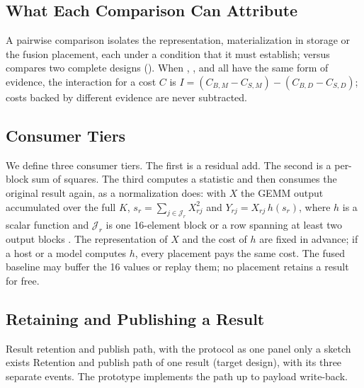 \subsection{What Each Comparison Can Attribute}\label{sec:attribution}

\begin{table}[t]
\centering{}%
\caption{Attribution matrix: what each pairwise comparison isolates, and the condition it must establish, not assume.}\label{tab:attribution}

\end{table}

%
A pairwise comparison isolates the representation, materialization in storage or the fusion placement, each under a condition that it must establish; \armBD versus \armSE compares two complete designs ().
When \armBD, \armSD, \armBM and \armSM all have the same form of evidence, the interaction for a cost $C$ is $I=(C_{B,M}-C_{S,M})-(C_{B,D}-C_{S,D})$; costs backed by different evidence are never subtracted.

\subsection{Consumer Tiers}\label{sec:tiers}

%
We define three consumer tiers.
The first is a residual add.
The second is a per-block sum of squares.
The third computes a statistic and then consumes the original result again, as a normalization does: with $X$ the GEMM output accumulated over the full $K$, $s_r=\sum_{j\in\mathcal{J}_r}X_{rj}^2$ and $Y_{rj}=X_{rj}\,h(s_r)$, where $h$ is a scalar function and $\mathcal{J}_r$ is one 16-element block or a row spanning at least two output blocks
.
The representation of $X$ and the cost of $h$ are fixed in advance; if a host or a model computes $h$, every placement pays the same cost.
The fused baseline may buffer the 16 values or replay them; no placement retains a result for free.

\subsection{Retaining and Publishing a Result}\label{sec:retain}

%
  {Result retention and publish path, with the protocol as one panel}%
  {only a sketch exists}%
  {Retention and publish path of one result (target design), with its three separate events. The prototype implements the path up to payload write-back.}

